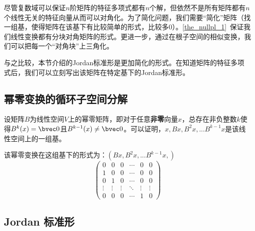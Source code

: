 

\begin{issues}
\issueDraft
\end{issues}
尽管复数域可以保证$n$阶矩阵的特征多项式都有$n$个解，但依然不是所有矩阵都有$n$个线性无关的特征向量从而可以对角化。为了简化问题，我们需要“简化”矩阵（找一组基，使得矩阵在该基下有比较简单的形式，比较多$0$）。\autoref{the_nullpl_1}~保证我们线性变换都有分块对角矩阵的形式。更进一步，通过在根子空间的相似变换，我们可以把每一个“对角块”上三角化。

与之比较，本节介绍的Jordan标准形是更加简化的形式。在知道矩阵的特征多项式后，我们可以立刻写出该矩阵在特定基下的Jordan标准形。
\subsection{幂零变换的循环子空间分解}
设矩阵$B$为线性空间$V$上的幂零矩阵，即对于任意\textbf{非零}向量$x$，总存在非负整数$k$使得$B^{k}(x)=\bvec 0$且$B^{k-1}(x)\neq \bvec 0$。可以证明，${x,Bx,B^2x,...B^{k-1}x}$是该线性空间上的一组基。
\begin{exercise}{}
证明：$\opn{Span}{\x,Bx,B^2x,...B^{k-1}x\}$张成该线性空间。
\end{exercise}
该幂零变换在这组基下的形式为：$(Bx,B^2x,...B^{k-1}x,)$
\begin{equation}
\left(\begin{array}{cccccc}
0 & 0 & 0 & \cdots & 0 & 0 \\
1 & 0 & 0 & \cdots & 0 & 0 \\
0 & 1 & 0 & \cdots & 0 & 0 \\
\vdots & \vdots & \vdots & \ddots & \vdots & \vdots \\
0 & 0 & 0 & \cdots & 1 & 0
\end{array}\right)
\end{equation}



\subsection{Jordan 标准形}